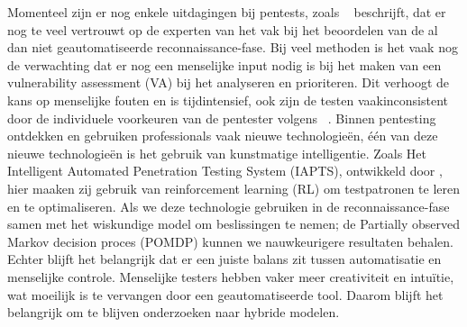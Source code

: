 Momenteel zijn er nog enkele uitdagingen bij pentests, zoals ~\textcite{Fugkeaw} beschrijft, dat er nog te veel vertrouwt  
op de experten van het vak bij het beoordelen van de al dan niet geautomatiseerde reconnaissance-fase. Bij veel methoden is het vaak nog de verwachting dat er nog een menselijke input nodig is bij het maken van een vulnerability assessment (VA) bij het analyseren en prioriteren. Dit verhoogt de kans op menselijke fouten en is tijdintensief, ook zijn de testen vaakinconsistent door de individuele voorkeuren van de pentester volgens ~\textcite{Ghanem}.
Binnen pentesting ontdekken en gebruiken professionals vaak nieuwe technologieën, één van deze nieuwe technologieën is het gebruik van kunstmatige intelligentie. Zoals Het Intelligent Automated Penetration Testing System (IAPTS), ontwikkeld door \textcite{Ghanem}, hier maaken zij gebruik van reinforcement learning (RL) om testpatronen te leren en te optimaliseren. Als we deze technologie gebruiken in de reconnaissance-fase samen met het wiskundige model om beslissingen te nemen; de Partially observed Markov decision proces (POMDP) kunnen we nauwkeurigere resultaten behalen. Echter blijft het belangrijk dat er een juiste balans zit tussen automatisatie en menselijke controle. Menselijke testers hebben vaker meer creativiteit en intuïtie, wat moeilijk is te vervangen door een geautomatiseerde tool. Daarom blijft het belangrijk om te blijven onderzoeken naar hybride modelen.








